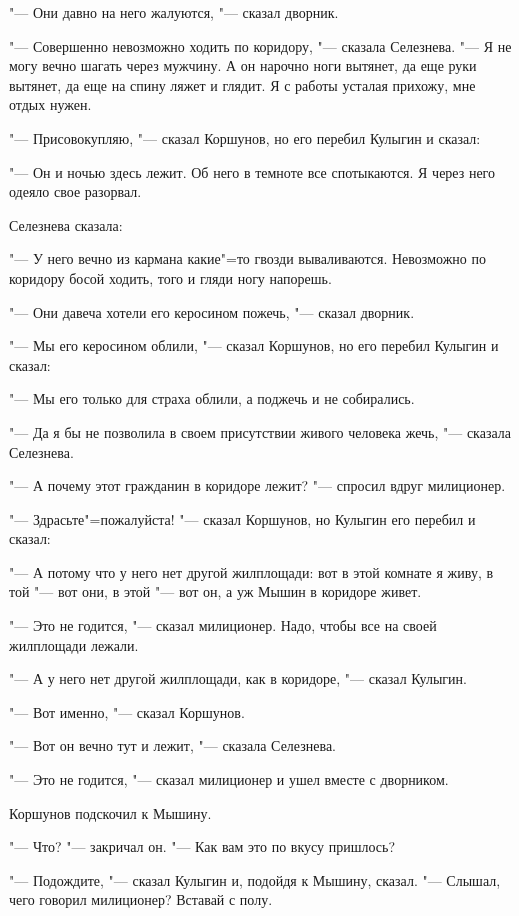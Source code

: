 "--- Они  давно  на него жалуются, "--- сказал
дворник.

"--- Совершенно  невозможно ходить по коридору, "--- сказала  Селезнева. "--- Я не могу вечно шагать через мужчину.  А  он нарочно ноги
вытянет, да еще руки вытянет, да еще на спину ляжет и глядит. Я с работы усталая прихожу, мне отдых нужен.

"--- Присовокупляю, "---  сказал  Коршунов, но
его перебил Кулыгин и сказал:

"--- Он и ночью здесь лежит. Об него в темноте все  спотыкаются.  Я  через него одеяло
свое разорвал.

    Селезнева сказала:
    
"--- У него вечно из кармана какие"=то гвозди вываливаются.  Невозможно по коридору босой ходить, того и гляди ногу напорешь.

"--- Они  давеча хотели  его  керосином пожечь, "--- сказал дворник.

"--- Мы его керосином облили, "--- сказал Коршунов, но его перебил Кулыгин и сказал:

"--- Мы  его  только  для страха облили,  а
поджечь и не собирались.

"--- Да я бы не позволила в  своем  присутствии живого человека жечь, "--- сказала Селезнева.

"--- А почему этот гражданин в коридоре лежит? "--- спросил вдруг милиционер.

"--- Здрасьте"=пожалуйста!  "---  сказал Коршунов, но Кулыгин его перебил и сказал:

"--- А  потому  что  у него нет другой жилплощади: вот в этой комнате я живу, в той  "---
вот они, в этой "--- вот он, а уж Мышин в коридоре живет.

"--- Это не годится, "--- сказал милиционер. Надо, чтобы все на своей жилплощади лежали.

"--- А у него  нет другой жилплощади, как в
коридоре, "--- сказал Кулыгин.

"--- Вот именно, "--- сказал Коршунов.

"--- Вот он вечно тут  и  лежит, "---  сказала
Селезнева.

"--- Это не годится, "--- сказал милиционер  и
ушел вместе с дворником.

    Коршунов подскочил к Мышину.
    
"--- Что?  "--- закричал  он. "--- Как вам это по
вкусу пришлось?

"--- Подождите, "--- сказал Кулыгин и, подойдя
к Мышину, сказал. "--- Слышал, чего говорил милиционер? Вставай с полу.


